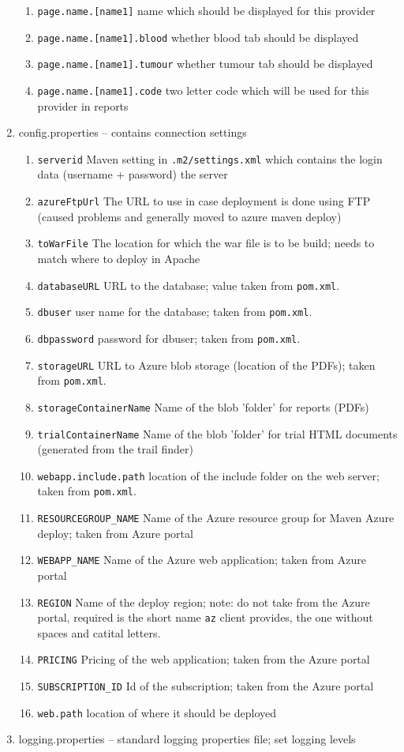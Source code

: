 \begin{enumerate}
\begin{enumerate}
  	  \item \verb|page.name.[name1]| name which should be displayed for this provider
  	  \item \verb|page.name.[name1].blood| whether blood tab should be displayed
  	  \item \verb|page.name.[name1].tumour| whether tumour tab should be displayed
  	  \item \verb|page.name.[name1].code| two letter code which will be used for this provider in reports 
	\end{enumerate}
  \item config.properties -- contains connection settings
    \begin{enumerate}
      \item \verb|serverid| Maven setting in \verb|.m2/settings.xml| which contains the login data (username + password) the server
      \item \verb|azureFtpUrl| The URL to use in case deployment is done using FTP (caused problems and generally moved to azure maven deploy)
      \item \verb|toWarFile| The location for which the war file is to be build; needs to match where to deploy in Apache
  	  \item \verb|databaseURL| URL to the database; value taken from \verb|pom.xml|. 
  	  \item \verb|dbuser| user name for the database; taken from \verb|pom.xml|.
  	  \item \verb|dbpassword| password for dbuser; taken from \verb|pom.xml|.
  	  \item \verb|storageURL| URL to Azure blob storage (location of the PDFs); taken from \verb|pom.xml|.
  	  \item \verb|storageContainerName| Name of the blob 'folder' for reports (PDFs)
  	  \item \verb|trialContainerName| Name of the blob 'folder' for trial HTML documents (generated from the trail finder)
  	  \item \verb|webapp.include.path| location of the include folder on the web server; taken from \verb|pom.xml|.
  	  \item \verb|RESOURCEGROUP_NAME| Name of the Azure resource group for Maven Azure deploy; taken from Azure portal
  	  \item \verb|WEBAPP_NAME| Name of the Azure web application; taken from Azure portal
  	  \item \verb|REGION| Name of the deploy region; note: do not take from the Azure portal, required is the short name \verb|az| client provides, the one without spaces and catital letters.
  	  \item \verb|PRICING| Pricing of the web application; taken from the Azure portal
  	  \item \verb|SUBSCRIPTION_ID| Id of the subscription; taken from the Azure portal
  	  \item \verb|web.path| location of where it should be deployed
	\end{enumerate}
  \item logging.properties -- standard logging properties file; set logging levels
\end{enumerate}

